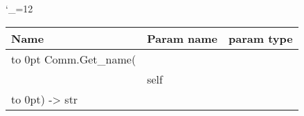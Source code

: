 \begingroup \catcode`\_=12 \tt
\begin{tabular}{lll}
\toprule
\textrm{Name}&\textrm{Param name}&\textrm{param type}\\
\midrule
\hbox to 0pt {Comm.Get_name(\hss}\\
& self\\
\hbox to 0pt{) -> str\hss}\\
\bottomrule
\end{tabular}
\endgroup
